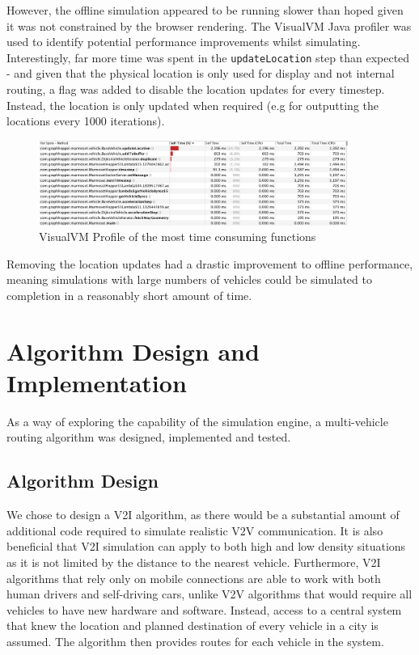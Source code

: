 \documentclass[ %
                    author={Alexander Hill},
                supervisor={Dr. Benjamin Sach},
                    degree={MEng},
                     title={MARMOSET},
                  subtitle={Multi-Agent Route Management using Online Simulation for Efficient Transportation},
                      type={research},
                      year={2016} ]{dissertation}
\begin{document}
However, the offline simulation appeared to be running slower than hoped given
it was not constrained by the browser rendering. The VisualVM Java profiler was
used to identify potential performance improvements whilst simulating.
Interestingly, far more time was spent in the \texttt{updateLocation} step than
expected - and given that the physical location is only used for display and not
internal routing, a flag was added to disable the location updates for every
timestep. Instead, the location is only updated when required (e.g for
outputting the locations every 1000 iterations).

\begin{figure}[h]
    \centering
    \includegraphics[width=0.9\textwidth,clip,trim=0 7cm 0 0]{visualvm-profile}
    \caption{VisualVM Profile of the most time consuming functions}\label{fig:visualvm}
\end{figure}

Removing the location updates had a drastic improvement to offline performance,
meaning simulations with large numbers of vehicles could be simulated to
completion in a reasonably short amount of time.

\section{Algorithm Design and Implementation}

As a way of exploring the capability of the simulation engine, a multi-vehicle
routing algorithm was designed, implemented and tested.

\subsection{Algorithm Design}\label{sec:algo}

We chose to design a V2I algorithm, as there would be a substantial amount of
additional code required to simulate realistic V2V communication. It is also
beneficial that V2I simulation can apply to both high and low density situations
as it is not limited by the distance to the nearest vehicle. Furthermore, V2I
algorithms that rely only on mobile connections are able to work with both human
drivers and self-driving cars, unlike V2V algorithms that would require all
vehicles to have new hardware and software.  Instead, access to a central system
that knew the location and planned destination of every vehicle in a city is
assumed. The algorithm then provides routes for each vehicle in the system.
\end{document}
